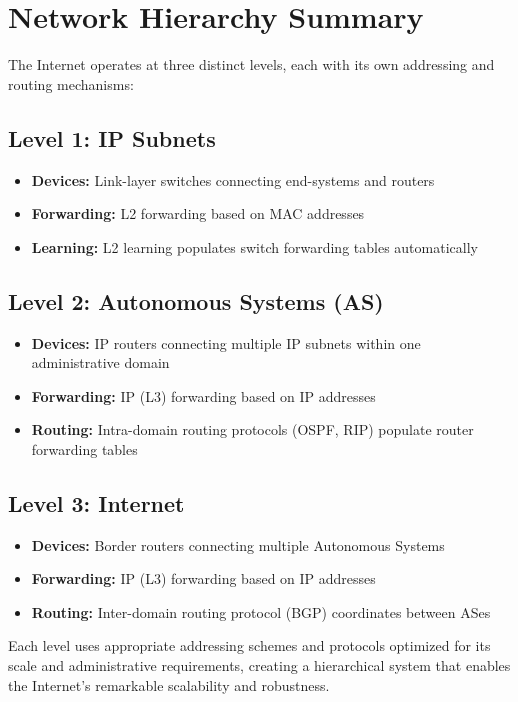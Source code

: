 \documentclass[../../compsys.tex]{subfiles}
\begin{document}
\newpage
\section{Network Hierarchy Summary}

The Internet operates at three distinct levels, each with its own addressing and routing mechanisms:

\subsection{Level 1: IP Subnets}
\begin{itemize}
    \item \textbf{Devices:} Link-layer switches connecting end-systems and routers
    \item \textbf{Forwarding:} L2 forwarding based on MAC addresses
    \item \textbf{Learning:} L2 learning populates switch forwarding tables automatically
\end{itemize}

\subsection{Level 2: Autonomous Systems (AS)}
\begin{itemize}
    \item \textbf{Devices:} IP routers connecting multiple IP subnets within one administrative domain
    \item \textbf{Forwarding:} IP (L3) forwarding based on IP addresses
    \item \textbf{Routing:} Intra-domain routing protocols (OSPF, RIP) populate router forwarding tables
\end{itemize}

\subsection{Level 3: Internet}
\begin{itemize}
    \item \textbf{Devices:} Border routers connecting multiple Autonomous Systems
    \item \textbf{Forwarding:} IP (L3) forwarding based on IP addresses
    \item \textbf{Routing:} Inter-domain routing protocol (BGP) coordinates between ASes
\end{itemize}

Each level uses appropriate addressing schemes and protocols optimized for its scale and administrative requirements, creating a hierarchical system that enables the Internet's remarkable scalability and robustness.
\end{document}
